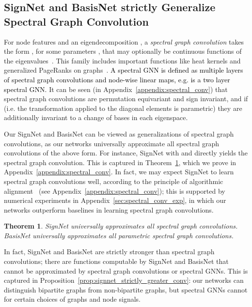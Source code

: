 \documentclass{article} \usepackage{iclr2023_conference,times}
\newtheorem{theorem}{Theorem}
\newcommand{\rebut}[1]{\textcolor{black}{#1}}
\begin{document}
\subsection{SignNet and BasisNet strictly Generalize Spectral Graph Convolution}\label{sec:spectral_conv}

For node features  and an eigendecomposition , a \emph{spectral graph convolution} takes the form , for some parameters , that may optionally be continuous functions  of the eigenvalues~\citep{bruna2014spectral,defferrard2016convolutional}. This family includes important functions like heat kernels and generalized PageRanks on graphs~\citep{li2019optimizing}. \rebut{A spectral GNN is defined as multiple layers of spectral graph convolutions and node-wise linear maps, e.g.  is a two layer spectral GNN.}
It can be seen (in Appendix~\ref{appendix:spectral_conv}) that spectral graph convolutions are permutation equivariant and sign invariant, and if  (i.e. the transformation applied to the diagonal elements is parametric) they are additionally invariant to a change of bases in each eigenspace. 

Our SignNet and BasisNet can be viewed as generalizations of spectral graph convolutions, as our networks universally approximate all spectral graph convolutions of the above form. For instance, SignNet with  and  directly yields the spectral graph convolution. This is captured in  Theorem~\ref{prop:spectral_conv}, which we prove in Appendix~\ref{appendix:spectral_conv}. In fact, we may expect SignNet to learn spectral graph convolutions well, according to the principle of algorithmic alignment~\citep{xu2019can} (see Appendix~\ref{appendix:spectral_conv}); this is supported by numerical experiments in Appendix~\ref{sec:spectral_conv_exp}, in which our networks outperform baselines in learning spectral graph convolutions.

\begin{theorem}\label{prop:spectral_conv}
    SignNet universally approximates all spectral graph convolutions. BasisNet universally approximates all parametric spectral graph convolutions.
\end{theorem}

In fact, SignNet and BasisNet are strictly stronger than spectral graph convolutions; there are functions computable by SignNet and BasisNet that cannot be approximated by spectral graph convolutions or spectral GNNs. This is captured in Proposition~\ref{prop:signnet_strictly_greater_conv}: our networks can distinguish bipartite graphs from non-bipartite graphs, but spectral GNNs cannot for certain choices of graphs and node signals.
\end{document}
